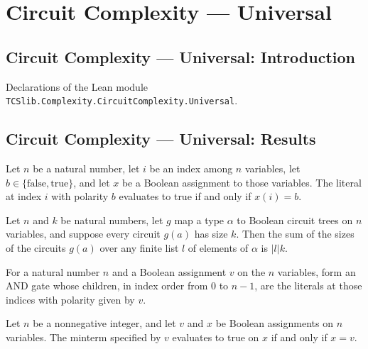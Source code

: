 \section{Circuit Complexity --- Universal}
\subsection*{Circuit Complexity --- Universal: Introduction}

Declarations of the Lean module \texttt{TCSlib.Complexity.CircuitComplexity.Universal}.

\subsection*{Circuit Complexity --- Universal: Results}

\begin{theorem}
\label{BoolCircuit.lit_eval_iff}
\leanok
{}
Let $n$ be a natural number, let $i$ be an index among $n$ variables, let
$b\in\{\mathrm{false},\mathrm{true}\}$, and let $x$ be a Boolean assignment to those
variables. The literal at index $i$ with polarity $b$ evaluates to true if and only if
$x(i)=b$.
\end{theorem}

\begin{theorem}
\label{BoolCircuit.foldr_size_map}
\leanok
{}
Let $n$ and $k$ be natural numbers, let $g$ map a type $\alpha$ to Boolean circuit trees
on $n$ variables, and suppose every circuit $g(a)$ has size $k$. Then the sum of the
sizes of the circuits $g(a)$ over any finite list $l$ of elements of $\alpha$ is $|l|k$.
\end{theorem}

\begin{definition}
\label{BoolCircuit.minterm}
\leanok
{}
For a natural number $n$ and a Boolean assignment $v$ on the $n$ variables, form an AND
gate whose children, in index order from $0$ to $n-1$, are the literals at those indices
with polarity given by $v$.
\end{definition}

\begin{theorem}
\label{BoolCircuit.minterm_eval_iff}
\leanok
{}
Let $n$ be a nonnegative integer, and let $v$ and $x$ be Boolean assignments on $n$
variables. The minterm specified by $v$ evaluates to true on $x$ if and only if $x=v$.
\end{theorem}

